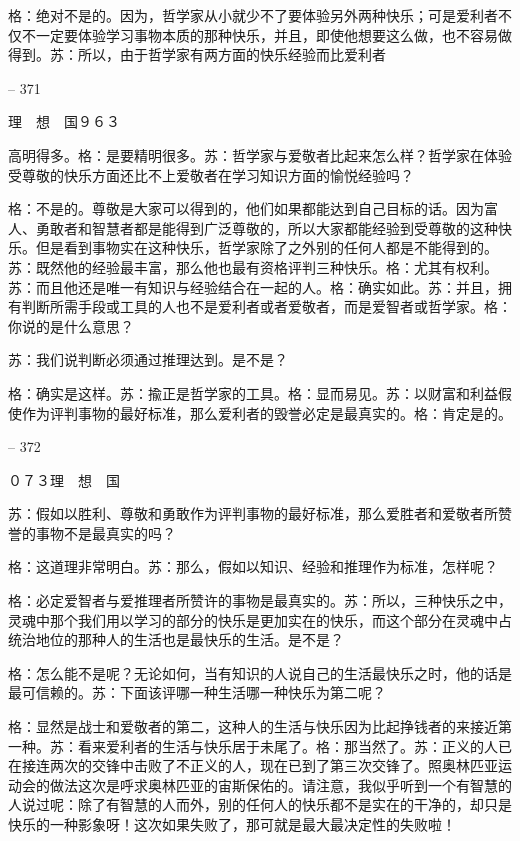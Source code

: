 \documentclass[11pt,oneside]{book}
\begin{document}
\begin{common-format}
    格：绝对不是的。因为，哲学家从小就少不了要体验另外两种快乐；可是爱利者不仅不一定要体验学习事物本质的那种快乐，并且，即使他想要这么做，也不容易做得到。苏：所以，由于哲学家有两方面的快乐经验而比爱利者

    

-- 371

    理　想　国９６３

    高明得多。格：是要精明很多。苏：哲学家与爱敬者比起来怎么样？哲学家在体验受尊敬的快乐方面还比不上爱敬者在学习知识方面的愉悦经验吗？

    格：不是的。尊敬是大家可以得到的，他们如果都能达到自己目标的话。因为富人、勇敢者和智慧者都是能得到广泛尊敬的，所以大家都能经验到受尊敬的这种快乐。但是看到事物实在这种快乐，哲学家除了之外别的任何人都是不能得到的。苏：既然他的经验最丰富，那么他也最有资格评判三种快乐。格：尤其有权利。苏：而且他还是唯一有知识与经验结合在一起的人。格：确实如此。苏：并且，拥有判断所需手段或工具的人也不是爱利者或者爱敬者，而是爱智者或哲学家。格：你说的是什么意思？

    苏：我们说判断必须通过推理达到。是不是？

    格：确实是这样。苏：揄正是哲学家的工具。格：显而易见。苏：以财富和利益假使作为评判事物的最好标准，那么爱利者的毁誉必定是最真实的。格：肯定是的。

    

-- 372

    ０７３理　想　国

    苏：假如以胜利、尊敬和勇敢作为评判事物的最好标准，那么爱胜者和爱敬者所赞誉的事物不是最真实的吗？

    格：这道理非常明白。苏：那么，假如以知识、经验和推理作为标准，怎样呢？

    格：必定爱智者与爱推理者所赞许的事物是最真实的。苏：所以，三种快乐之中，灵魂中那个我们用以学习的部分的快乐是更加实在的快乐，而这个部分在灵魂中占统治地位的那种人的生活也是最快乐的生活。是不是？

    格：怎么能不是呢？无论如何，当有知识的人说自己的生活最快乐之时，他的话是最可信赖的。苏：下面该评哪一种生活哪一种快乐为第二呢？

    格：显然是战士和爱敬者的第二，这种人的生活与快乐因为比起挣钱者的来接近第一种。苏：看来爱利者的生活与快乐居于未尾了。格：那当然了。苏：正义的人已在接连两次的交锋中击败了不正义的人，现在已到了第三次交锋了。照奥林匹亚运动会的做法这次是呼求奥林匹亚的宙斯保佑的。请注意，我似乎听到一个有智慧的人说过呢：除了有智慧的人而外，别的任何人的快乐都不是实在的干净的，却只是快乐的一种影象呀！这次如果失败了，那可就是最大最决定性的失败啦！


\end{common-format}
\end{document}
